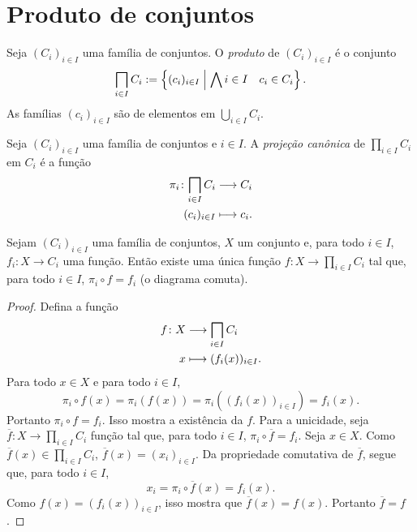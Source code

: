 \cleardoublepage
\section{Produto de conjuntos}

   \begin{definition}
Seja $(C_i)_{i \in I}$ uma família de conjuntos. O \emph{produto} de $(C_i)_{i \in I}$ é o conjunto
	\begin{equation*}
	\prod_{i \in I} C_i := \set{(c_i)_{i \in I}}{\forall i \in I \quad c_i \in C_i}.
	\end{equation*}
As famílias $(c_i)_{i \in I}$ são de elementos em $\bigcup_{i \in I} C_i$.
\end{definition}

\begin{definition}
Seja $(C_i)_{i \in I}$ uma família de conjuntos e $i \in I$. A \emph{projeção canônica} de $\prod_{i \in I} C_i$ em $C_i$ é a função
	\begin{align*}
	\func{\pi_i}{\prod_{i \in I} C_i}{C_i}{(c_i)_{i \in I}}{c_i}.
	\end{align*}
\end{definition}

\begin{proposition}
Sejam $(C_i)_{i \in I}$ uma família de conjuntos, $X$ um conjunto e, para todo $i \in I$, $f_i: X \to C_i$ uma função. Então existe uma única função $f: X \to \prod_{i \in I} C_i$ tal que, para todo $i \in I$, $\pi_i \circ f = f_i$ (o diagrama comuta).
\begin{figure}
\centering
{}
\end{figure}
\end{proposition}
\begin{proof}
Defina a função
	\begin{align*}
	\func{f}{X}{\prod_{i \in I} C_i}{x}{(f_i(x))_{i \in I}}.
	\end{align*}
Para todo $x \in X$ e para todo $i \in I$,
	\begin{equation*}
	\pi_i \circ f(x) = \pi_i (f(x)) = \pi_i ((f_i(x))_{i \in I}) = f_i(x).
	\end{equation*}
Portanto $\pi_i \circ f = f_i$. Isso mostra a existência da $f$. Para a unicidade, seja $\overline{f}: X \to \prod_{i \in I} C_i$ função tal que, para todo $i \in I$, $\pi_i \circ \overline{f} = f_i$. Seja $x \in X$.  Como $\overline{f}(x) \in \prod_{i \in I} C_i$, $\overline{f}(x) = (x_i)_{i \in I}$. Da propriedade comutativa de $\overline{f}$, segue que, para todo $i \in I$,
	\begin{equation*}
	x_i = \pi_i \circ \overline{f}(x) = f_i(x).
	\end{equation*}
Como $f(x) = (f_i(x))_{i \in I}$, isso mostra que $\overline{f}(x) = f(x)$. Portanto $\overline{f} = f$.
\end{proof}



